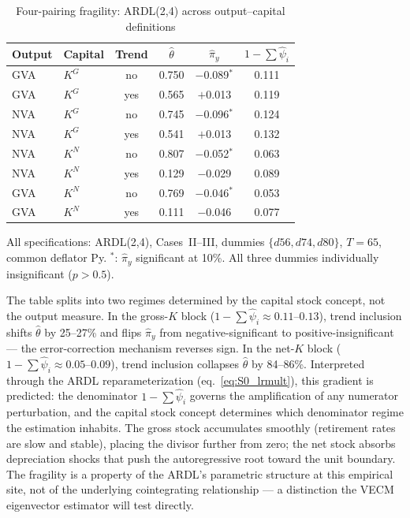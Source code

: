 \documentclass[11pt,a4paper]{article}
\begin{document}
\begin{table}[!ht]
	\centering
	\small
	\caption{Four-pairing fragility: ARDL(2,4) across output--capital definitions}
	\label{tab:S0_fourpair}
	\begin{tabular}{llcccc}
		\hline\hline
		Output & Capital & Trend & $\hat{\theta}$ & $\hat{\pi}_y$
		       & $1 - \sum\hat{\psi}_i$ \\
		\hline
		GVA & $K^G$ & no    & 0.750 & $-$0.089$^{*}$ & 0.111 \\
		GVA & $K^G$ & yes   & 0.565 & $+$0.013        & 0.119 \\[3pt]
		NVA & $K^G$ & no    & 0.745 & $-$0.096$^{*}$ & 0.124 \\
		NVA & $K^G$ & yes   & 0.541 & $+$0.013        & 0.132 \\[3pt]
		NVA & $K^N$ & no    & 0.807 & $-$0.052$^{*}$ & 0.063 \\
		NVA & $K^N$ & yes   & 0.129 & $-$0.029        & 0.089 \\[3pt]
		GVA & $K^N$ & no    & 0.769 & $-$0.046$^{*}$ & 0.053 \\
		GVA & $K^N$ & yes   & 0.111 & $-$0.046        & 0.077 \\
		\hline
	\end{tabular}
	\par\vspace{0.3em}
	\footnotesize
	All specifications: ARDL(2,4), Cases~II--III, dummies
	$\{d56,d74,d80\}$, $T = 65$, common deflator Py.
	$^{*}$: $\hat{\pi}_y$ significant at 10\%.
	All three dummies individually insignificant ($p > 0.5$).
\end{table}

The table splits into two regimes determined by the capital stock concept,
not the output measure. In the gross-$K$ block
($1 - \sum\hat{\psi}_i \approx 0.11$--$0.13$), trend inclusion shifts
$\hat{\theta}$ by 25--27\% and flips $\hat{\pi}_y$ from
negative-significant to positive-insignificant --- the error-correction
mechanism reverses sign. In the net-$K$ block
($1 - \sum\hat{\psi}_i \approx 0.05$--$0.09$), trend inclusion collapses
$\hat{\theta}$ by 84--86\%. Interpreted through the ARDL reparameterization
(eq.~\ref{eq:S0_lrmult}), this gradient is predicted: the denominator
$1 - \sum\hat{\psi}_i$ governs the amplification of any numerator
perturbation, and the capital stock concept determines which denominator
regime the estimation inhabits. The gross stock accumulates smoothly
(retirement rates are slow and stable), placing the divisor further from
zero; the net stock absorbs depreciation shocks that push the autoregressive
root toward the unit boundary. The fragility is a property of the ARDL's
parametric structure at this empirical site, not of the underlying
cointegrating relationship --- a distinction the VECM eigenvector estimator
will test directly.
\end{document}
